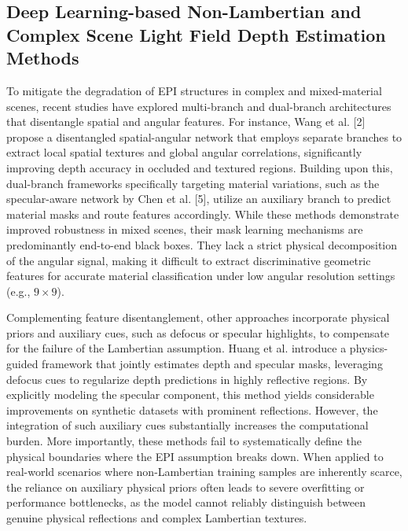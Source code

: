 \subsection{Deep Learning-based Non-Lambertian and Complex Scene Light Field Depth Estimation Methods}

To mitigate the degradation of EPI structures in complex and mixed-material scenes, recent studies have explored multi-branch and dual-branch architectures that disentangle spatial and angular features. For instance, Wang et al. [2] propose a disentangled spatial-angular network that employs separate branches to extract local spatial textures and global angular correlations, significantly improving depth accuracy in occluded and textured regions. Building upon this, dual-branch frameworks specifically targeting material variations, such as the specular-aware network by Chen et al. [5], utilize an auxiliary branch to predict material masks and route features accordingly. While these methods demonstrate improved robustness in mixed scenes, their mask learning mechanisms are predominantly end-to-end black boxes. They lack a strict physical decomposition of the angular signal, making it difficult to extract discriminative geometric features for accurate material classification under low angular resolution settings (e.g., $9 \times 9$).

Complementing feature disentanglement, other approaches incorporate physical priors and auxiliary cues, such as defocus or specular highlights, to compensate for the failure of the Lambertian assumption. Huang et al. introduce a physics-guided framework that jointly estimates depth and specular masks, leveraging defocus cues to regularize depth predictions in highly reflective regions. By explicitly modeling the specular component, this method yields considerable improvements on synthetic datasets with prominent reflections. However, the integration of such auxiliary cues substantially increases the computational burden. More importantly, these methods fail to systematically define the physical boundaries where the EPI assumption breaks down. When applied to real-world scenarios where non-Lambertian training samples are inherently scarce, the reliance on auxiliary physical priors often leads to severe overfitting or performance bottlenecks, as the model cannot reliably distinguish between genuine physical reflections and complex Lambertian textures.


